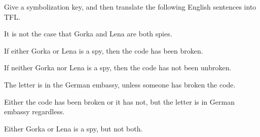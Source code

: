 \begin{comment}
\begin{earg}
\item John Coltrane played tenor and soprano sax. 
\item Neither Miles Davis nor John Coltrane played tuba. 
\item John Coltrane did not play both tenor sax and tuba. 
\item John Coltrane did not play tenor sax unless he also played soprano sax. 
\item John Coltrane did not play tuba, but Miles Davis did. 
\item Miles Davis played trumpet only if he also played tuba. 

\item If Miles Davis played trumpet, then John Coltrane played at least one of these three instruments: tenor sax, soprano sax, or tuba. 

\item It is not the case that if John Coltrane played tuba then Miles Davis played trumpet or tuba. 

\item Miles Davis and John Coltrane both played tuba if and only if Coltrane did not play tenor sax and Miles Davis did not play trumpet. 
\end{earg}
\end{comment}

\problempart
\label{pr.spies}
Give a symbolization key, and then translate the following English sentences into TFL.
\begin{earg}
\item It is not the case that Gorka and Lena are both spies.
\item If either Gorka or Lena is a spy, then the code has been broken.
\item If neither Gorka nor Lena is a spy, then the code has not been unbroken.
\item The letter is in the German embassy, unless someone has broken the code.
\item Either the code has been broken or it has not, but the letter is in German embassy regardless.
\item Either Gorka or Lena is a spy, but not both.
\end{earg}


